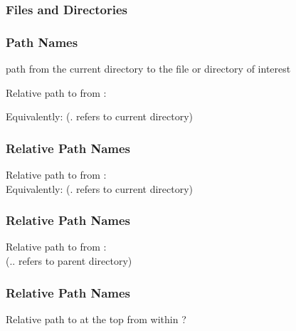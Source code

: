 \documentclass[12pt]{beamer}\usepackage[]{graphicx}\usepackage[]{color}
\begin{document}

\begin{frame}[fragile]
\frametitle{Files and Directories}
\begin{center}
\end{center}
\end{frame}


\begin{frame}[fragile]
\frametitle{Path Names}

\bi
  \item path from the current directory to the file or directory of interest
  \item Relative path to  from : {\hilit {}}
  \item Equivalently: {\hilit {}}  (. refers to current directory)
\ei
\eb

\end{frame}


\begin{frame}[fragile]
\frametitle{Relative Path Names}
\begin{center}
\end{center}
Relative path to  from : {\hilit {}} \\
Equivalently: {\hilit {}}  (. refers to current directory)
\end{frame}


\begin{frame}[fragile]
\frametitle{Relative Path Names}
\begin{center}
\end{center}
Relative path to  from : {\hilit {}} \\
(.. refers to parent directory)

\end{frame}


\begin{frame}[fragile]
\frametitle{Relative Path Names}
\begin{center}
\end{center}
Relative path to  at the top from within ?

\end{frame}
\end{document}
